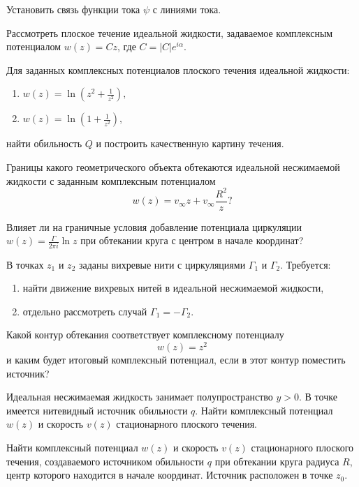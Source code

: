 \documentclass[14pt]{extarticle}
\begin{document}
\begin{problems}

	\item Установить связь функции тока  $\psi$ с линиями тока.

	\item Рассмотреть плоское течение идеальной жидкости, задаваемое комп\-лекс\-ным потенциалом $w(z) = Cz$, где $C = |C| e^{i \alpha}$.

	\item Для заданных комплексных потенциалов плоского течения идеальной жидкости:
		\begin{enumerate}
			\item 
			$
				w(z) = \ln \left( z^2 + \displaystyle\frac{1}{z^2} \right),
			$
			\item 
			$ 
			w(z) = \ln \left( 1 + \displaystyle\frac{1}{z^2} \right),
			$
		\end{enumerate}
	найти обильность $Q$ и построить качественную картину течения.
	
	\item 
	Границы какого геометрического объекта обтекаются идеальной нес\-жи\-ма\-е\-мой жидкости с заданным комплексным потенциалом
	\[
		w(z)  = v_\infty z + v_\infty \frac{R^2}{z}?
	\]
	
	Влияет ли на граничные условия добавление потенциала цир\-ку\-ля\-ции  $w(z) = \displaystyle\frac{\Gamma}{2 \pi i} \ln z$ при обтекании круга с центром в начале координат?
	
	
	\item В точках $z_1$ и $z_2$ заданы вихревые нити с циркуляциями $\Gamma_1$ и $\Gamma_2$. Требуется:
	\begin{enumerate}
		\item найти движение вихревых нитей в идеальной несжимаемой жидкости, 
		\item отдельно рассмотреть случай $\Gamma_1 = -\Gamma_2$.
	\end{enumerate}

	\item
	Какой контур обтекания соответствует комплексному потенциалу
	\[
	w(z) = z^2
	\]
	и каким будет итоговый комплексный потенциал, если в этот контур поместить источник?
	
	\item
	Идеальная несжимаемая жидкость занимает полупространство $y>0$. В точке  имеется нитевидный источник обильности $q$. Найти комплексный потенциал $w(z)$ и скорость $v(z)$ стационарного плоского течения.
	
	\item
	Найти комплексный потенциал $w(z)$ и скорость $v(z)$ стационарного плоского течения, создаваемого источником обильности $q$ при обтекании круга радиуса $R$, центр которого находится в начале координат. Источник расположен в точке $z_0$. 
	

\end{problems}
\end{document}
